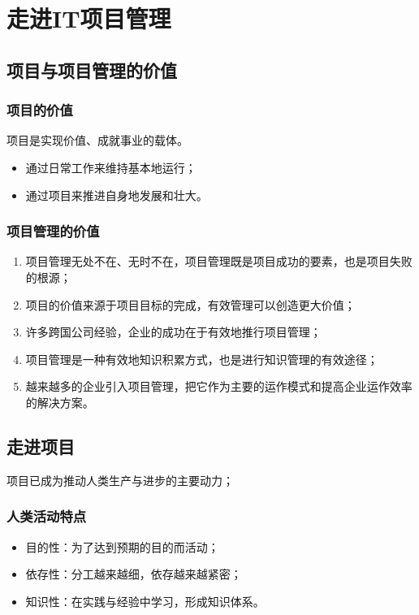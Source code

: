 \chapter{走进IT项目管理}
\section{项目与项目管理的价值}
\subsection{项目的价值}
项目是实现价值、成就事业的载体。
\begin{itemize}
	\item 通过日常工作来维持基本地运行；
	\item 通过项目来推进自身地发展和壮大。
\end{itemize}
\subsection{项目管理的价值}
\begin{enumerate}
	\item 项目管理无处不在、无时不在，项目管理既是项目成功的要素，也是项目失败的根源；
	\item 项目的价值来源于项目目标的完成，有效管理可以创造更大价值；
	\item 许多跨国公司经验，企业的成功在于有效地推行项目管理；
	\item 项目管理是一种有效地知识积累方式，也是进行知识管理的有效途径；
	\item 越来越多的企业引入项目管理，把它作为主要的运作模式和提高企业运作效率的解决方案。
\end{enumerate}
\section{走进项目}
项目已成为推动人类生产与进步的主要动力；
\subsection{人类活动特点}
\begin{itemize}
	\item 目的性：为了达到预期的目的而活动；
	\item 依存性：分工越来越细，依存越来越紧密；
	\item 知识性：在实践与经验中学习，形成知识体系。
\end{itemize}
